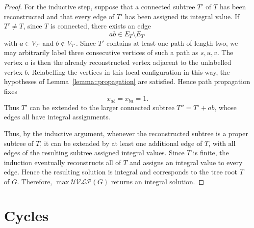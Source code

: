 \documentclass[11pt]{article}
\newtheorem{conjecture}{Conjecture}
\begin{document}
\begin{proof}
  For the inductive step, suppose that a connected subtree $T'$ of $T$ has been reconstructed and that every edge of $T'$ has been assigned its integral value. If $T'\neq T$, since $T$ is connected, there exists an edge 
  \[ 
  ab \in E_T \setminus E_{T'} 
  \] 
  with $a \in V_{T'}$ and $b \notin V_{T'}$. Since $T'$ contains at least one path of length two, we may arbitrarily label three consecutive vertices of such a path as $s,u,v$. The vertex $a$ is then the already reconstructed vertex adjacent to the unlabelled vertex $b$. Relabelling the vertices in this local configuration in this way, the hypotheses of Lemma~\ref{lemma::propagation} are satisfied. Hence path propagation fixes 
  \[ 
  x_{ab}=x_{ba}=1. 
  \] 
  Thus $T'$ can be extended to the larger connected subtree $T''=T'+ab$, whose edges all have integral assignments. 
  
  Thus, by the inductive argument, whenever the reconstructed subtree is a proper subtree of $T$, it can be extended by at least one additional edge of $T$, with all edges of the resulting subtree assigned integral values. Since $T$ is finite, the induction eventually reconstructs all of $T$ and assigns an integral value to every edge. Hence the resulting solution is integral and corresponds to the tree root $T$ of $G$. Therefore, $\max\mathcal{UVLP}(G)$ returns an integral solution.
\end{proof}


\section{Cycles}







\end{document}
